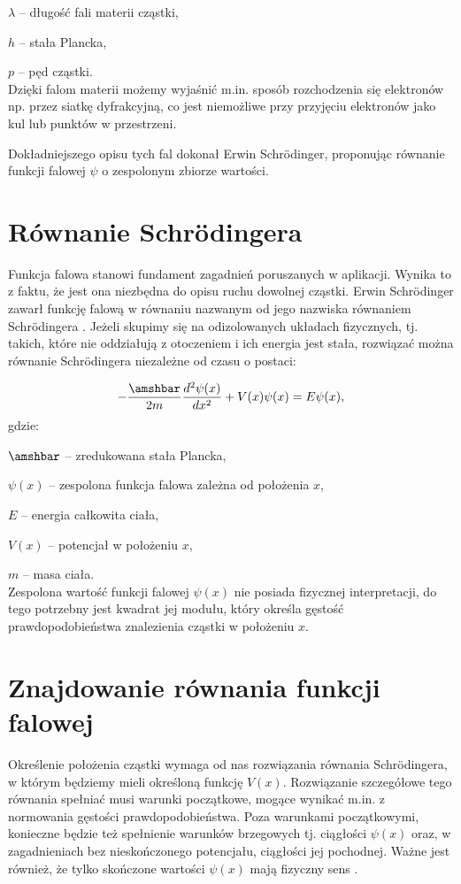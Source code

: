 \documentclass{SGGW-thesis}
\begin{document}
	 $\lambda$ -- długość fali materii cząstki,
	 
	 $h$ -- stała Plancka,
	 
	 $p$ -- pęd cząstki.\\
	 
	 Dzięki falom materii możemy wyjaśnić m.in. sposób rozchodzenia się elektronów np. przez siatkę dyfrakcyjną, co jest niemożliwe przy przyjęciu elektronów jako kul lub punktów w przestrzeni.
	 
	 Dokładniejszego opisu tych fal dokonał Erwin Schrödinger, proponując równanie funkcji falowej $\psi$ o zespolonym zbiorze wartości. 
	 
	\section{Równanie Schrödingera}
	Funkcja falowa stanowi fundament zagadnień poruszanych w aplikacji. Wynika to z faktu, że jest ona niezbędna do opisu ruchu dowolnej cząstki. Erwin Schrödinger zawarł funkcję falową w równaniu nazwanym od jego nazwiska równaniem Schrödingera \cite{schrodinger-equation}.  Jeżeli skupimy się na odizolowanych układach fizycznych, tj. takich, które nie oddziałują z otoczeniem i ich energia jest stała, rozwiązać można równanie Schrödingera niezależne od czasu o postaci:
	
	\begin{equation}
		-\frac{\amshbar}{2m} \frac{d^2\psi(x)}{dx^2} + V(x)\psi(x) = E\psi(x),
	\end{equation}
	gdzie:
	
	$\amshbar$ -- zredukowana stała Plancka,
	
	$\psi(x)$ -- zespolona funkcja falowa zależna od położenia $x$,
	
	$E$ -- energia całkowita ciała,
	
	$V(x)$ -- potencjał w położeniu $x$,
	
	$m$ -- masa ciała.\\
	
	Zespolona wartość funkcji falowej $\psi(x)$ nie posiada fizycznej interpretacji, do tego potrzebny jest kwadrat jej modułu, który określa gęstość prawdopodobieństwa znalezienia cząstki w położeniu $x$. 
	\section{Znajdowanie równania funkcji falowej}
	Określenie położenia cząstki wymaga od nas rozwiązania równania Schrödingera, w którym będziemy mieli określoną funkcję $V(x)$. Rozwiązanie szczegółowe tego równania spełniać musi warunki początkowe, mogące wynikać m.in. z normowania gęstości prawdopodobieństwa. Poza warunkami początkowymi, konieczne będzie też spełnienie warunków brzegowych tj. ciągłości $\psi(x)$ oraz, w zagadnieniach bez nieskończonego potencjału, ciągłości jej pochodnej. Ważne jest również, że tylko skończone wartości $\psi(x)$ mają fizyczny sens \cite{fiz atom}.
	
\end{document}
